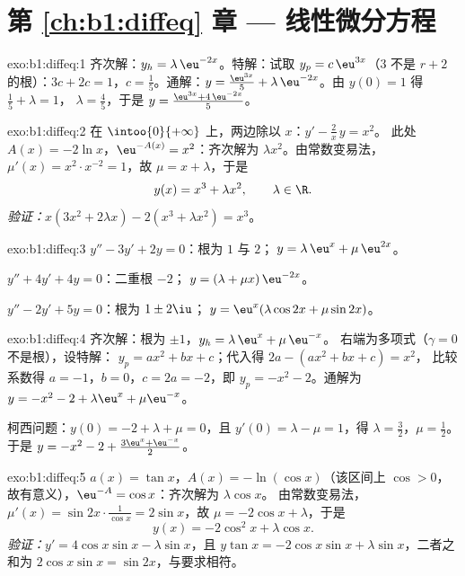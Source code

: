 \section*{第 \ref{ch:b1:diffeq} 章 --- 线性微分方程}

\begin{solution}{exo:b1:diffeq:1}
齐次解：$y_h = \lambda\,\eu^{-2x}$。特解：试取 $y_p =
c\,\eu^{3x}$（$3$ 不是 $r + 2$ 的根）：$3c + 2c = 1$，$c =
\frac15$。通解：$y = \frac{\eu^{3x}}{5} +
\lambda\,\eu^{-2x}$。由 $y(0) = 1$ 得 $\frac15 + \lambda = 1$，
$\lambda = \frac45$，于是 $y = \frac{\eu^{3x} + 4\,\eu^{-2x}}{5}$。
\end{solution}

\begin{solution}{exo:b1:diffeq:2}
在 $\intoo{0}{+\infty}$ 上，两边除以 $x$：$y' - \frac{2}{x}\,y = x^2$。
此处 $A(x) = -2\ln x$，$\eu^{-A(x)} = x^2$：齐次解为
$\lambda x^2$。由常数变易法，$\mu'(x) = x^2 \cdot x^{-2} =
1$，故 $\mu = x + \lambda$，于是
\[
y(x) = x^3 + \lambda x^2, \qquad \lambda \in \R .
\]
\emph{验证：}$x(3x^2 + 2\lambda x) - 2(x^3 + \lambda x^2) = x^3$。
\end{solution}

\begin{solution}{exo:b1:diffeq:3}
$y'' - 3y' + 2y = 0$：根为 $1$ 与 $2$；$\;y = \lambda\,\eu^{x} +
\mu\,\eu^{2x}$。

$y'' + 4y' + 4y = 0$：二重根 $-2$；$\;y = (\lambda + \mu
x)\,\eu^{-2x}$。

$y'' - 2y' + 5y = 0$：根为 $1 \pm 2\iu$；$\;y = \eu^{x}(\lambda\cos
2x + \mu\sin 2x)$。
\end{solution}

\begin{solution}{exo:b1:diffeq:4}
齐次解：根为 $\pm 1$，$y_h = \lambda\,\eu^x + \mu\,\eu^{-x}$。
右端为多项式（$\gamma = 0$ 不是根），设特解：
$y_p = ax^2 + bx + c$；代入得 $2a - (ax^2 + bx + c) = x^2$，
比较系数得 $a = -1$，$b = 0$，$c = 2a = -2$，即 $y_p = -x^2 - 2$。通解为
$y = -x^2 - 2 + \lambda\eu^x + \mu\eu^{-x}$。

柯西问题：$y(0) = -2 + \lambda + \mu = 0$，且 $y'(0) = \lambda - \mu =
1$，得 $\lambda = \frac32$，$\mu = \frac12$。于是
$y = -x^2 - 2 + \frac{3\eu^x + \eu^{-x}}{2}$。
\end{solution}

\begin{solution}{exo:b1:diffeq:5}
$a(x) = \tan x$，$A(x) = -\ln(\cos x)$（该区间上 $\cos > 0$，
故有意义），$\eu^{-A} = \cos x$：齐次解为 $\lambda\cos x$。
由常数变易法，$\mu'(x) = \sin 2x \cdot \frac{1}{\cos x} =
2\sin x$，故 $\mu = -2\cos x + \lambda$，于是
\[
y(x) = -2\cos^2 x + \lambda \cos x .
\]
\emph{验证：}$y' = 4\cos x \sin x - \lambda\sin x$，且 $y\tan x =
-2\cos x\sin x + \lambda \sin x$，二者之和为 $2\cos x\sin x =
\sin 2x$，与要求相符。
\end{solution}

